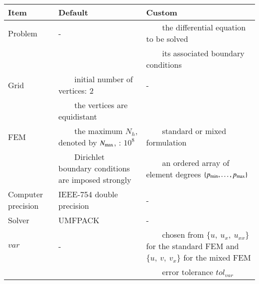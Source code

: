 \documentclass[review,3p]{elsarticle}
\newcommand{\tabitem}{~~\llap{\textbullet}~~}           %
\begin{document}
\begin{table}[!ht]
\label{settings_algorithm}
  \centering
  \begin{tabular}{lL{5cm}L{6cm}}
    \toprule
    Item & Default & Custom  \\
    \midrule
    Problem & - & \tabitem the differential equation to be solved \\
     &  & \tabitem its associated boundary conditions \\\hline
    Grid & \tabitem initial number of vertices: 2 & - \\
     & \tabitem the vertices are equidistant &  \\\hline
    FEM & \tabitem the maximum $N_h$, denoted by $N_{\rm max}$, : $10^8$ & \tabitem standard or mixed formulation \\
    & \tabitem Dirichlet boundary conditions are imposed strongly & \tabitem an ordered array of element degrees $\{p_{\min}, \ldots, p_{\rm max}\}$ \\\hline
    Computer precision & IEEE-754 double precision & - \\\hline
    Solver & UMFPACK & - \\\hline
    $var$ & - & \tabitem chosen from $\{u,~u_x,~u_{xx}\}$ for the standard FEM and $\{u,~v,~v_{x}\}$ for the mixed FEM \\     
    & & \tabitem error tolerance $tol_{var}$ \\     
    \bottomrule
  \end{tabular}
\end{table}
\end{document}
